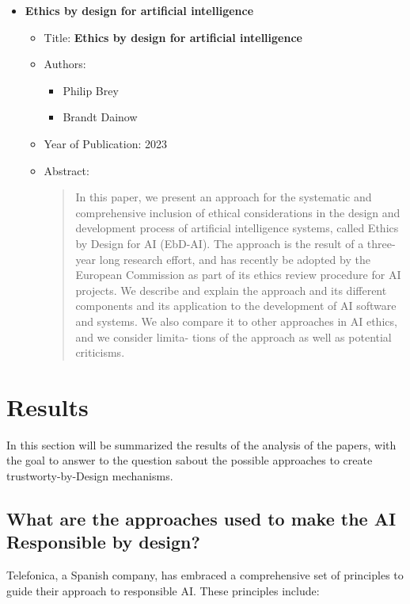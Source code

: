 \documentclass{article}
\begin{document}
\begin{itemize}
        \item \textbf{Ethics by design for artificial intelligence}
        \begin{itemize}
            \item Title: \textbf{Ethics by design for artificial intelligence}
            \item Authors:
            \begin{itemize}
                \item Philip Brey
                \item Brandt Dainow
            \end{itemize}
            \item Year of Publication: 2023
            \item Abstract:
            \begin{abstract}
                In this paper, we present an approach for the systematic and comprehensive inclusion of ethical considerations in the design 
                and development process of artificial intelligence systems, called Ethics by Design for AI (EbD-AI). The approach is the 
                result of a three-year long research effort, and has recently be adopted by the European Commission as part of its ethics 
                review procedure for AI projects. We describe and explain the approach and its different components and its application to 
                the development of AI software and systems. We also compare it to other approaches in AI ethics, and we consider limita-
                tions of the approach as well as potential criticisms.
            \end{abstract}
        \end{itemize}
    \end{itemize}
    

\newpage
\section{Results}
In this section will be summarized the results of the analysis of the papers, with the goal to answer to the question sabout the possible approaches to create trustworty-by-Design mechanisms.

\subsection{What are the approaches used to make the AI Responsible by design?}
Telefonica, a Spanish company, has embraced a comprehensive set of principles to guide their approach to responsible AI. These principles include:
\end{document}
